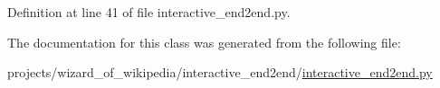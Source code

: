 Definition at line 41 of file interactive\+\_\+end2end.\+py.



The documentation for this class was generated from the following file\+:\begin{DoxyCompactItemize}
\item 
projects/wizard\+\_\+of\+\_\+wikipedia/interactive\+\_\+end2end/\hyperlink{interactive__end2end_8py}{interactive\+\_\+end2end.\+py}\end{DoxyCompactItemize}
